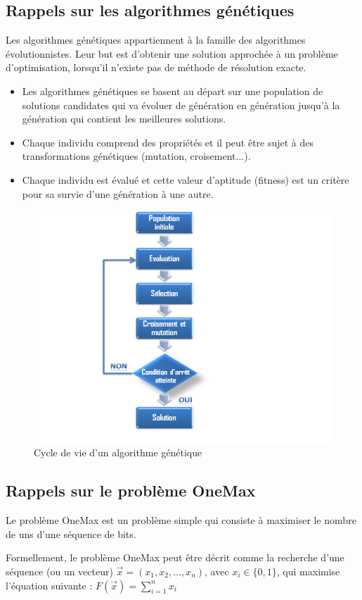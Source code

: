 \documentclass[12pt]{article}
\begin{document}
\subsection{Rappels sur les algorithmes génétiques}
\par Les algorithmes génétiques appartiennent à la famille des algorithmes évolutionnistes. Leur but est d'obtenir une solution approchée à un problème d'optimisation, lorsqu'il n'existe pas de méthode de résolution exacte.
\begin{itemize}[label=-]
\item Les algorithmes génétiques se basent au départ sur une population de solutions candidates qui va évoluer de génération en génération jusqu’à la génération qui contient les meilleures solutions.
\item Chaque individu comprend des propriétés et il peut être sujet à des transformations génétiques (mutation, croisement...).
\item Chaque individu est évalué et cette valeur d’aptitude (fitness) est un critère pour sa survie d’une génération à une autre.
\end{itemize}

\begin{figure}[H]
		\begin{center}
			\includegraphics[scale=0.4]{img/algo_genetique.png}
			\caption{Cycle de vie d'un algorithme génétique}
			\label{algo_genetique}
		\end{center}
\end{figure}

\subsection{Rappels sur le problème OneMax}
\par Le problème OneMax est un problème simple qui consiste à maximiser le nombre de uns d'une séquence de bits.
\par Formellement, le problème OneMax peut être décrit comme la recherche d'une séquence (ou un vecteur) $ \vec{x} = (x_1, x_2, ... , x_n) $, avec $ x_i \in \{0,1\} $, qui maximise l'équation suivante : $ F(\vec{x}) = \sum_{i=1}^{n} x_i $
\end{document}
